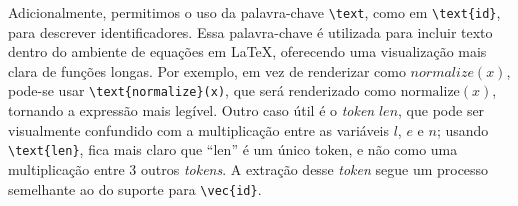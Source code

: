 %


Adicionalmente, permitimos o uso da palavra-chave \verb|\text|, como em \verb|\text{id}|, para descrever identificadores. Essa palavra-chave é utilizada para incluir texto dentro do ambiente de equações em \LaTeX{}, oferecendo uma visualização mais clara de funções longas. Por exemplo, em vez de renderizar como \( normalize(x) \), pode-se usar \verb|\text{normalize}(x)|, que será renderizado como \( \text{normalize}(x) \), tornando a expressão mais legível. Outro caso útil é o \textit{token} $len$, que pode ser visualmente confundido com a multiplicação entre as variáveis \(l\), \(e\) e \(n\); usando \verb|\text{len}|, fica mais claro que ``$\text{len}$'' é um único token, e não como uma multiplicação entre 3 outros \textit{tokens}. A extração desse \textit{token} segue um processo semelhante ao do suporte para \verb|\vec{id}|.

